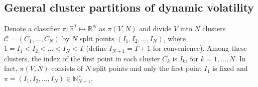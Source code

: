 \documentclass[preprint,12pt,authoryear]{elsarticle}
\newtheorem{example}{Example}
\begin{document}


\subsection{General cluster partitions of dynamic volatility}

Denote a classifier $\pi: \mathbb{R}^T\mapsto\mathbb{R}^N$ as $\pi(V,N)$ and divide $V$ into $N$ clusters $\mathcal{C}=\left(C_1,\dots,C_N\right)$ by $N$ split points $\left(I_1,I_2,\dots,I_N\right)$, where $1=I_1<I_2<\dots<I_N<T$ (define $I_{N+1}=T+1$ for convenience).
Among these clusters, the index of the first point in each cluster $C_k$ is $I_k$, for $k=1,\dots,N.$
In fact, $\pi(V,N)$ consists of $N$ split points and only the first point $I_1$  is fixed and $\pi=(I_1,I_2,\dots,I_N)\in\mathbb{N}^+_{N-1}.$
\end{document}

